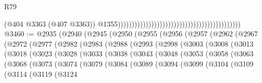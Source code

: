\begin{lexlean}{R79}
\begin{coremodule}
                                                                                            (@404
                                                                                              @3363
                                                                                              (@407
                                                                                                @3363))
                                                                                            @1355))))))))))))))))))))))))))))))))))))))))))))
@3460 := @2935
    (@2940
      (@2945
        (@2950
          (@2955
            (@2956
              (@2957
                (@2962
                  (@2967
                    (@2972
                      (@2977
                        (@2982
                          (@2983
                            (@2988
                              (@2993
                                (@2998
                                  (@3003
                                    (@3008
                                      (@3013
                                        (@3018
                                          (@3023
                                            (@3028
                                              (@3033
                                                (@3038
                                                  (@3043
                                                    (@3048
                                                      (@3053
                                                        (@3058
                                                          (@3063
                                                            (@3068
                                                              (@3073
                                                                (@3074
                                                                  (@3079
                                                                    (@3084
                                                                      (@3089
                                                                        (@3094
                                                                          (@3099
                                                                            (@3104
                                                                              (@3109
                                                                                (@3114
                                                                                  (@3119
                                                                                    (@3124

\end{coremodule}
\end{lexlean}
